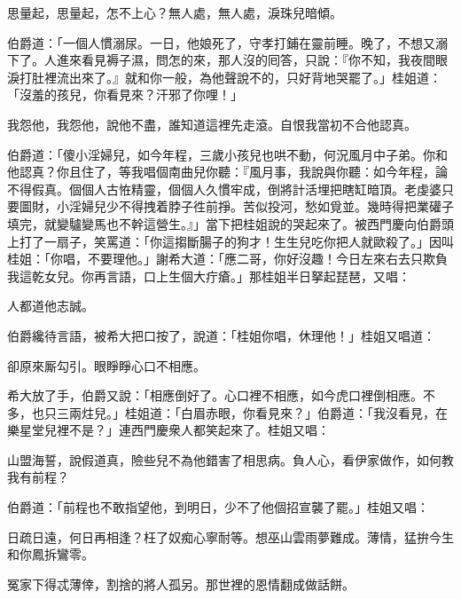 \begin{myquote} 
思量起，思量起，怎不上心？無人處，無人處，淚珠兒暗傾。
\end{myquote} 

伯爵道：「一個人慣溺尿。一日，他娘死了，守孝打鋪在靈前睡。晚了，不想又溺下了。人進來看見褥子濕，問怎的來，那人沒的囘答，只說：『你不知，我夜間眼淚打肚裡流出來了。』就和你一般，為他聲說不的，只好背地哭罷了。」桂姐道：「沒羞的孩兒，你看見來？汗邪了你哩！」

\begin{myquote}
我怨他，我怨他，說他不盡，誰知道這裡先走滾。自恨我當初不合他認真。
\end{myquote}

伯爵道：「傻小淫婦兒，如今年程，三歲小孩兒也哄不動，何況風月中子弟。你和他認真？你且住了，等我唱個南曲兒你聽：『風月事，我說與你聽：如今年程，論不得假真。個個人古恠精靈，個個人久慣牢成，倒將計活埋把瞎缸暗頂。老虔婆只要圖財，小淫婦兒少不得拽着脖子徃前掙。苦似投河，愁如覓並。幾時得把業礶子填完，就變驢變馬也不幹這營生。』」當下把桂姐說的哭起來了。{}被西門慶向伯爵頭上打了一扇子，笑罵道：「你這搊斷腸子的狗才！生生兒吃你把人就歐殺了。」因叫桂姐：「你唱，不要理他。」謝希大道：「應二哥，你好沒趣！今日左來右去只欺負我這乾女兒。你再言語，口上生個大疔瘡。」那桂姐半日拏起琵琶，又唱：

\begin{myquote}
人都道他志誠。
\end{myquote}

伯爵纔待言語，被希大把口按了，{}說道：「桂姐你唱，休理他！」桂姐又唱道：

\begin{myquote}
卻原來厮勾引。眼睜睜心口不相應。
\end{myquote}

希大放了手，伯爵又說：「相應倒好了。心口裡不相應，如今虎口裡倒相應。不多，也只三兩炷兒。」桂姐道：「白眉赤眼，你看見來？」伯爵道：「我沒看見，在樂星堂兒裡不是？」連西門慶衆人都笑起來了。桂姐又唱：

\begin{myquote}
山盟海誓，說假道真，險些兒不為他錯害了相思病。負人心，看伊家做作，如何教我有前程？
\end{myquote}

伯爵道：「前程也不敢指望他，到明日，少不了他個招宣襲了罷。」桂姐又唱：

\begin{myquote}
日疏日遠，何日再相逢？枉了奴痴心寧耐等。想巫山雲雨夢難成。薄情，猛拚今生和你鳳拆鸞零。

冤家下得忒薄倖，割捨的將人孤另。那世裡的恩情翻成做話餅。
\end{myquote}

